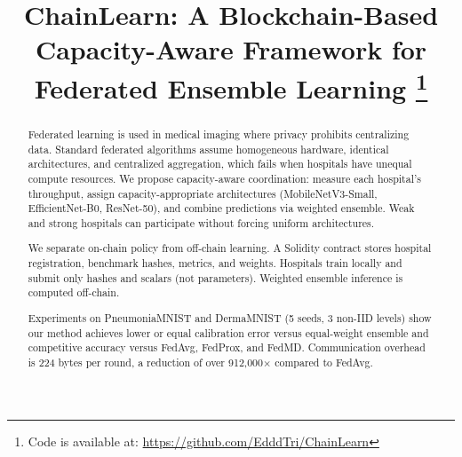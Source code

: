 \documentclass[conference]{IEEEtran}
\begin{document}
\title{ChainLearn: A Blockchain-Based Capacity-Aware Framework for Federated Ensemble Learning
\thanks{Code is available at: \url{https://github.com/EdddTri/ChainLearn}}}

\author{
    \and
    \and
    \and
}

\maketitle

\begin{abstract}

Federated learning is used in medical imaging where privacy prohibits centralizing data. Standard federated algorithms assume homogeneous hardware, identical architectures, and centralized aggregation, which fails when hospitals have unequal compute resources. We propose capacity-aware coordination: measure each hospital's throughput, assign capacity-appropriate architectures (MobileNetV3-Small, EfficientNet-B0, ResNet-50), and combine predictions via weighted ensemble. Weak and strong hospitals can participate without forcing uniform architectures.

We separate on-chain policy from off-chain learning. A Solidity contract stores hospital registration, benchmark hashes, metrics, and weights. Hospitals train locally and submit only hashes and scalars (not parameters). Weighted ensemble inference is computed off-chain.

Experiments on PneumoniaMNIST and DermaMNIST (5 seeds, 3 non-IID levels) show our method achieves lower or equal calibration error versus equal-weight ensemble and competitive accuracy versus FedAvg, FedProx, and FedMD. Communication overhead is 224 bytes per round, a reduction of over 912,000$\times$ compared to FedAvg.

\end{abstract}
\end{document}
